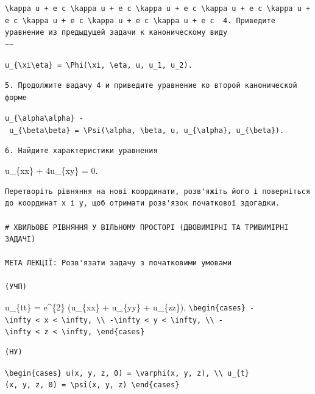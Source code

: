 \documentclass[
  ukrainian,
]{article}
\begin{document}
\begin{verbatim}
\kappa u + e c \kappa u + e c \kappa u + e c \kappa u + e c \kappa u + e c \kappa u + e c \kappa u + e c \kappa u + e c  4. Приведите уравнение из предыдущей задачи к каноническому виду
~~
\end{verbatim}

\texttt{u\_\{\textbackslash{}xi\textbackslash{}eta\}\ =\ \textbackslash{}Phi(\textbackslash{}xi,\ \textbackslash{}eta,\ u,\ u\_1,\ u\_2).}

\begin{verbatim}
5. Продолжите вадачу 4 и приведите уравнение ко второй канонической форме
\end{verbatim}

\texttt{u\_\{\textbackslash{}alpha\textbackslash{}alpha\}\ -\ u\_\{\textbackslash{}beta\textbackslash{}beta\}\ =\ \textbackslash{}Psi(\textbackslash{}alpha,\ \textbackslash{}beta,\ u,\ u\_\{\textbackslash{}alpha\},\ u\_\{\textbackslash{}beta\}).}

\begin{verbatim}
6. Найдите характеристики уравнения
\end{verbatim}

u\_\{xx\} + 4u\_\{xy\} = 0.

\begin{verbatim}
Перетворіть рівняння на нові координати, розв'яжіть його і поверніться до координат x і y, щоб отримати розв'язок початкової здогадки.

# ХВИЛЬОВЕ РІВНЯННЯ У ВІЛЬНОМУ ПРОСТОРІ (ДВОВИМІРНІ ТА ТРИВИМІРНІ ЗАДАЧІ)

МЕТА ЛЕКЦІЇ: Розв'язати задачу з початковими умовами

(УЧП)
\end{verbatim}

u\_\{tt\} = e\^{}\{2\} (u\_\{xx\} + u\_\{yy\} + u\_\{zz\}),
\texttt{\textbackslash{}begin\{cases\}\ -\textbackslash{}infty\ \textless{}\ x\ \textless{}\ \textbackslash{}infty,\ \textbackslash{}\textbackslash{}\ -\textbackslash{}infty\ \textless{}\ y\ \textless{}\ \textbackslash{}infty,\ \textbackslash{}\textbackslash{}\ -\textbackslash{}infty\ \textless{}\ z\ \textless{}\ \textbackslash{}infty,\ \textbackslash{}end\{cases\}}

\begin{verbatim}
(НУ)
\end{verbatim}

\texttt{\textbackslash{}begin\{cases\}\ u(x,\ y,\ z,\ 0)\ =\ \textbackslash{}varphi(x,\ y,\ z),\ \textbackslash{}\textbackslash{}\ u\_\{t\}(x,\ y,\ z,\ 0)\ =\ \textbackslash{}psi(x,\ y,\ z)\ \textbackslash{}end\{cases\}}
\end{document}
